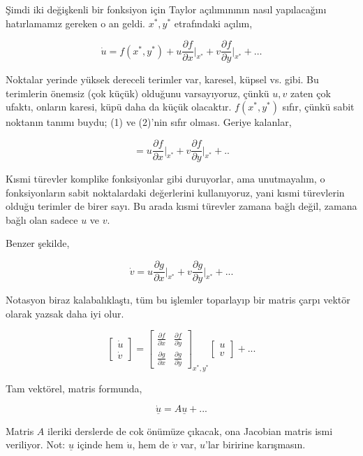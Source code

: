 \documentclass[12pt,fleqn]{article}\usepackage{../../common}
\begin{document}
Şimdi iki değişkenli bir fonksiyon için Taylor açılımınının nasıl yapılacağını
hatırlamamız gereken o an geldi. $x^\ast,y^\ast$ etrafındaki açılım,

$$
\dot{u} = f(x^\ast,y^\ast) + u
\frac{\partial f}{\partial x} \vert_{x^\ast} +
v \frac{\partial f}{\partial y} \vert_{x^\ast} + \dots
$$


Noktalar yerinde yüksek dereceli terimler var, karesel, küpsel vs. gibi. Bu
terimlerin önemsiz (çok küçük) olduğunu varsayıyoruz, çünkü $u,v$ zaten çok
ufaktı, onların karesi, küpü daha da küçük olacaktır. $f(x^\ast,y^\ast)$ sıfır, çünkü
sabit noktanın tanımı buydu; (1) ve (2)'nin sıfır olması. Geriye kalanlar, 

$$
=u \frac{\partial f}{\partial x}\vert_{x^\ast} +
 v \frac{\partial f}{\partial y}\vert_{x^\ast} + ..
$$ 

Kısmi türevler komplike fonksiyonlar gibi duruyorlar, ama unutmayalım, o
fonksiyonların sabit noktalardaki değerlerini kullanıyoruz, yani kısmi
türevlerin olduğu terimler de birer sayı. Bu arada kısmi türevler zamana bağlı
değil, zamana bağlı olan sadece $u$ ve $v$.

Benzer şekilde,

$$
\dot{v} =
u \frac{\partial g}{\partial x}\vert_{x^\ast} +
v \frac{\partial g}{\partial y}\vert_{x^\ast} + ...
$$ 

Notasyon biraz kalabalıklaştı, tüm bu işlemler toparlayıp bir matris çarpı
vektör olarak yazsak daha iyi olur.

$$
\left[\begin{array}{r}
\dot{u} \\ \dot{v}
\end{array}\right]
=
\left[\begin{array}{rr}
\frac{\partial f}{\partial x} & \frac{\partial f}{\partial y} \\
\frac{\partial g}{\partial x} & \frac{\partial g}{\partial y} 
\end{array}\right]_{x^\ast,y^\ast}
\left[\begin{array}{r} u \\ v \end{array}\right]
+ ...
$$

Tam vektörel, matris formunda,

$$ \dot{\underline{u}} = A \underline{u} + ...$$


Matris $A$ ileriki derslerde de cok önümüze çıkacak, ona Jacobian matris ismi
veriliyor.  Not: $\underline{u}$ içinde hem $\dot{u}$, hem de $\dot{v}$ var,
$u$'lar biririne karışmasın.
\end{document}
